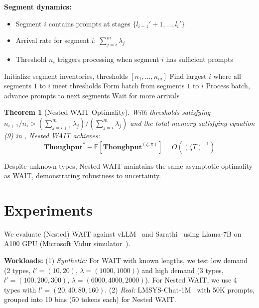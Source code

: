\documentclass[preprint]{article}
\newcommand{\throughput}{\textbf{Thoughput}}
\theoremstyle{plain}
\newtheorem{theorem}{Theorem}[section]
\theoremstyle{definition}
\theoremstyle{remark}
\begin{document}
\textbf{Segment dynamics:}
\begin{itemize}
\item Segment $i$ contains prompts at stages $\{l_{i-1}'+1, \ldots, l_i'\}$
\item Arrival rate for segment $i$: $\sum_{j=i}^m \lambda_j$ 
\item Threshold $n_i$ triggers processing when segment $i$ has sufficient prompts
\end{itemize}

\begin{algorithm}[h]
\caption{Nested WAIT Algorithm}
\begin{algorithmic}[1]\label{alg:nested_wait}
\STATE Initialize segment inventories, thresholds $[n_1,\ldots,n_m]$
    \STATE Find largest $i$ where all segments $1$ to $i$ meet thresholds
        \STATE Form batch from segments $1$ to $i$
        \STATE Process batch, advance prompts to next segments
    \ELSE
        \STATE Wait for more arrivals
    \ENDIF
\ENDWHILE
\end{algorithmic}
\end{algorithm}

\begin{theorem}[Nested WAIT Optimality]\label{thm:nested_wait_heavy_traffic}
With thresholds satisfying $n_{i+1}/n_i > (\sum_{j=i+1}^m\lambda_j)/(\sum_{j=i}^m\lambda_j)$ and the total memory satisfying equation (9) in \cite{ao2025optimizingllminferencefluidguided}, Nested WAIT achieves:
\[\throughput^* - \mathbb{E}[\throughput^{(\zeta,\pi)}] = O((\zeta T)^{-1})\]
\end{theorem}

Despite unknown types, Nested WAIT maintains the same asymptotic optimality as WAIT, demonstrating robustness to uncertainty.

\section{Experiments}

We evaluate (Nested) WAIT against vLLM~\cite{kwon2023efficient} and Sarathi~\cite{agrawal2023sarathi} using Llama-7B on A100 GPU (Microsoft Vidur simulator~\cite{agrawal2024vidur}).

\textbf{Workloads:} (1) \textit{Synthetic:} For WAIT with known lengths, we test low demand (2 types, $l'=(10,20)$, $\lambda=(1000,1000)$) and high demand (3 types, $l'=(100,200,300)$, $\lambda=(6000,4000,2000)$). For Nested WAIT, we use 4 types with $l'=(20,40,80,160)$. (2) \textit{Real:} LMSYS-Chat-1M~\cite{zheng2023lmsys} with 50K prompts, grouped into 10 bins (50 tokens each) for Nested WAIT.
\end{document}
